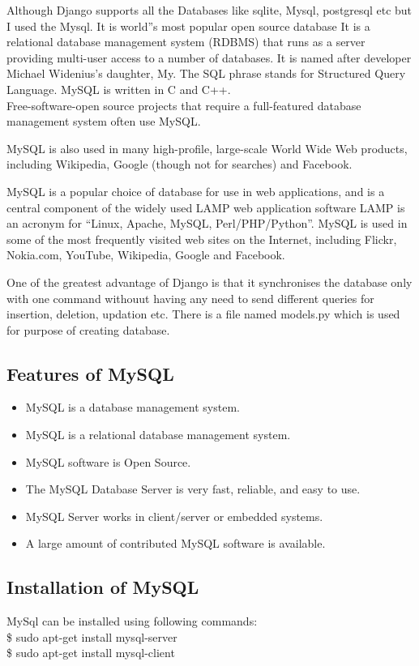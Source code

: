 \noindent Although Django supports all the Databases like sqlite, Mysql, postgresql etc 
but I used the Mysql. It is world''s most popular open source database It 
is a relational database management system (RDBMS) that runs as a server 
providing multi-user access to a number of databases. It is named after 
developer Michael Widenius's daughter, My. The SQL phrase stands for
Structured Query Language. MySQL is written in C and C++.\\
         Free-software-open source projects that require a 
full-featured database management system
often use MySQL.

MySQL is also used in many high-profile, large-scale World 
Wide Web products, including
Wikipedia, Google (though not for searches) and Facebook.

MySQL is a popular choice of database for use in web 
applications, and is a central component of the widely used LAMP web 
application software LAMP is an acronym for “Linux, Apache, MySQL, 
Perl/PHP/Python”.
         MySQL is used in some of the most frequently visited web sites 
on the Internet, including Flickr, Nokia.com, YouTube, Wikipedia, Google 
and Facebook.

One of the greatest advantage of Django is that it synchronises the 
database only with one command withouut having any need to send 
different queries for insertion, deletion, updation etc. There is a 
file named models.py which is used for purpose of creating database.
\subsection{Features of MySQL}
\begin{itemize}
\item MySQL is a database management system.
\item MySQL is a relational database management system.
\item MySQL software is Open Source.
\item The MySQL Database Server is very fast, reliable, and easy to 
use.
\item MySQL Server works in client/server or embedded systems.
\item A large amount of contributed MySQL software is available.
\end{itemize}
\subsection{Installation of MySQL}
MySql can be installed using following commands:\\

\hspace{4pt} \$ sudo apt-get install mysql-server\\

\hspace{4pt} \$ sudo apt-get install mysql-client
\newpage
